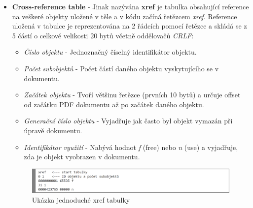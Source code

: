 \begin{itemize}
	\item \textbf{Cross-reference table} - Jinak nazývána \textbf{xref} je tabulka obsahující reference na veškeré objekty uložené v těle a v kódu začíná řetězcem \textit{xref}. Reference uložená v tabulce je reprezentována na 2 řádcích pomocí řetězce a skládá se z 5 částí o celkové velikosti 20 bytů včetně oddělovačů \textit{CRLF}:
	\begin{itemize}
		\item \textit{Číslo objektu} - Jednoznačný číselný identifikátor objektu.
		\item \textit{Počet subobjektů} - Počet částí daného objektu vyskytujícího se v dokumentu.
		\item \textit{Začátek objektu} - Tvoří většinu řetězce (prvních 10 bytů) a určuje offset od začátku PDF dokumentu až po začátek daného objektu.
		\item \textit{Generační číslo objektu} - Vyjadřuje jak často byl objekt vymazán při úpravě dokumentu. 
		\item \textit{Identifikátor využití} - Nabývá hodnot \textit{f} (free) nebo \textit{n} (use) a vyjadřuje, zda je objekt vyobrazen v dokumentu.
	\end{itemize}
	\begin{figure}[h!]
	\centering
	\includegraphics[width=15cm]{img/pdf_xref}
	\caption{Ukázka jednoduché xref tabulky}
	\label{fig:pdf_xref}
	\end{figure}


\end{itemize}
